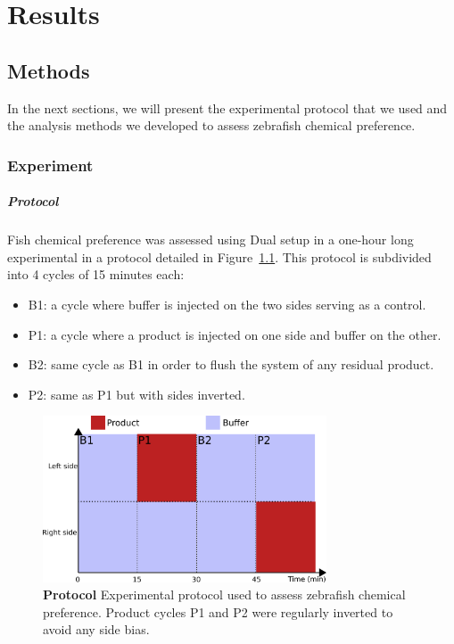 \chapter{Results}
  \section{Methods}
  In the next sections, we will present the experimental protocol that we used and the analysis methods we developed to assess zebrafish chemical preference.

  \subsection{Experiment}
  \paragraph{Protocol} Fish chemical preference was assessed using Dual setup in a one-hour long experimental in a protocol detailed in Figure~\ref{exp_protocol}. This protocol is subdivided into 4 cycles of 15 minutes each:
\begin{itemize}
  \item B1: a cycle where buffer is injected on the two sides serving as a control.
  \item P1: a cycle where a product is injected on one side and buffer on the other.
  \item B2: same cycle as B1 in order to flush the system of any residual product.
  \item P2: same as P1 but with sides inverted.
\end{itemize}

    \begin{figure}[h]
      \centering
      \includegraphics[width=0.75\textwidth]{part_2/assets/protocol.png}
      \caption{\textbf{Protocol} Experimental protocol used to assess zebrafish chemical preference. Product cycles P1 and P2 were regularly inverted to avoid any side bias.}
      \label{exp_protocol}
    \end{figure}

